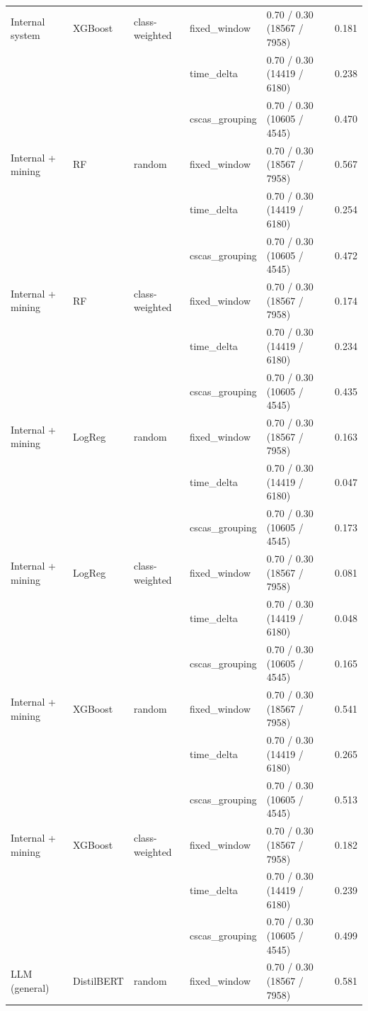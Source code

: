 \begin{table}[htbp]
{\begin{tabular}{lllllc}
\addlinespace
Internal system & XGBoost & class-weighted & fixed\_window & 0.70 / 0.30 (18567 / 7958) & 0.181 \\
 &  &  & time\_delta & 0.70 / 0.30 (14419 / 6180) & 0.238 \\
 &  &  & cscas\_grouping & 0.70 / 0.30 (10605 / 4545) & 0.470 \\
\midrule
Internal + mining & RF & random & fixed\_window & 0.70 / 0.30 (18567 / 7958) & 0.567 \\
 &  &  & time\_delta & 0.70 / 0.30 (14419 / 6180) & 0.254 \\
 &  &  & cscas\_grouping & 0.70 / 0.30 (10605 / 4545) & 0.472 \\
\addlinespace
Internal + mining & RF & class-weighted & fixed\_window & 0.70 / 0.30 (18567 / 7958) & 0.174 \\
 &  &  & time\_delta & 0.70 / 0.30 (14419 / 6180) & 0.234 \\
 &  &  & cscas\_grouping & 0.70 / 0.30 (10605 / 4545) & 0.435 \\
\addlinespace
Internal + mining & LogReg & random & fixed\_window & 0.70 / 0.30 (18567 / 7958) & 0.163 \\
 &  &  & time\_delta & 0.70 / 0.30 (14419 / 6180) & 0.047 \\
 &  &  & cscas\_grouping & 0.70 / 0.30 (10605 / 4545) & 0.173 \\
\addlinespace
Internal + mining & LogReg & class-weighted & fixed\_window & 0.70 / 0.30 (18567 / 7958) & 0.081 \\
 &  &  & time\_delta & 0.70 / 0.30 (14419 / 6180) & 0.048 \\
 &  &  & cscas\_grouping & 0.70 / 0.30 (10605 / 4545) & 0.165 \\
\addlinespace
Internal + mining & XGBoost & random & fixed\_window & 0.70 / 0.30 (18567 / 7958) & 0.541 \\
 &  &  & time\_delta & 0.70 / 0.30 (14419 / 6180) & 0.265 \\
 &  &  & cscas\_grouping & 0.70 / 0.30 (10605 / 4545) & 0.513 \\
\addlinespace
Internal + mining & XGBoost & class-weighted & fixed\_window & 0.70 / 0.30 (18567 / 7958) & 0.182 \\
 &  &  & time\_delta & 0.70 / 0.30 (14419 / 6180) & 0.239 \\
 &  &  & cscas\_grouping & 0.70 / 0.30 (10605 / 4545) & 0.499 \\
\midrule
LLM (general) & DistilBERT & random & fixed\_window & 0.70 / 0.30 (18567 / 7958) & 0.581 \\

\end{tabular}}
\end{table}

